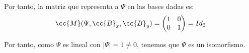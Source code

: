 \documentclass[12pt]{article}
\begin{document}
\begin{ejercicio}
        Por tanto, la matriz que representa a $\Psi$ en las bases dadas es:
        \begin{equation*}
            \cc{M}(\Psi, \cc{B}_x, \cc{B}_y)=\begin{pmatrix}
                1 & 0\\
                0 & 1
            \end{pmatrix}
            =Id_2
        \end{equation*}

        Por tanto, como $\Psi$ es lineal con $|\Psi|=1\neq 0$, tenemos que $\Psi$ es un isomorfismo.
    \end{ejercicio}
\end{document}
